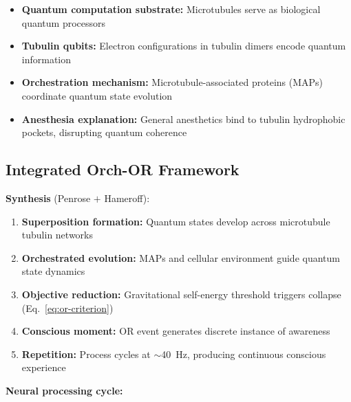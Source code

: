 \begin{itemize}
\item \textbf{Quantum computation substrate:} Microtubules serve as biological quantum processors
\item \textbf{Tubulin qubits:} Electron configurations in tubulin dimers encode quantum information
\item \textbf{Orchestration mechanism:} Microtubule-associated proteins (MAPs) coordinate quantum state evolution
\item \textbf{Anesthesia explanation:} General anesthetics bind to tubulin hydrophobic pockets, disrupting quantum coherence
\end{itemize}

\subsection{Integrated Orch-OR Framework}

\textbf{Synthesis} (Penrose $+$ Hameroff):

\begin{enumerate}
\item \textbf{Superposition formation:} Quantum states develop across microtubule tubulin networks
\item \textbf{Orchestrated evolution:} MAPs and cellular environment guide quantum state dynamics
\item \textbf{Objective reduction:} Gravitational self-energy threshold triggers collapse (Eq.~\ref{eq:or-criterion})
\item \textbf{Conscious moment:} OR event generates discrete instance of awareness
\item \textbf{Repetition:} Process cycles at $\sim$40~Hz, producing continuous conscious experience
\end{enumerate}

\textbf{Neural processing cycle:}

